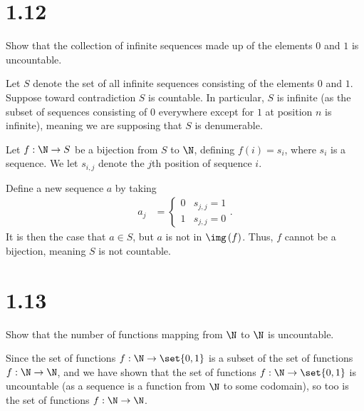 \documentclass[10pt]{mypackage}
\begin{document}
\section{1.12}%
\begin{problem}
  Show that the collection of infinite sequences made up of the elements $0$ and $1$ is uncountable.
\end{problem}
\begin{solution}
  Let $S$ denote the set of all infinite sequences consisting of the elements $0$ and $1$. Suppose toward contradiction $S$ is countable. In particular, $S$ is infinite (as the subset of sequences consisting of $0$ everywhere except for $1$ at position $n$ is infinite), meaning we are supposing that $S$ is denumerable.\newline

  Let $f: \N\rightarrow S$ be a bijection from $S$ to $\N$, defining $f\left(i\right) = s_i$, where $s_i$ is a sequence. We let $s_{i,j}$ denote the $j$th position of sequence $i$.\newline

  Define a new sequence $a$ by taking
  \begin{align*}
    a_{j} &= \begin{cases}
      0 & s_{j,j} = 1\\
      1 & s_{j,j} = 0
    \end{cases}.
  \end{align*}
  It is then the case that $a\in S$, but $a$ is not in $\img\left(f\right)$. Thus, $f$ cannot be a bijection, meaning $S$ is not countable.
\end{solution}
\section{1.13}%
\begin{problem}
  Show that the number of functions mapping from $\N$ to $\N$ is uncountable.
\end{problem}
\begin{solution}
  Since the set of functions $f: \N\rightarrow \set{0,1}$ is a subset of the set of functions $f:\N\rightarrow \N$, and we have shown that the set of functions $f: \N\rightarrow \set{0,1}$ is uncountable (as a sequence is a function from $\N$ to some codomain), so too is the set of functions $f: \N\rightarrow \N$.
\end{solution}
\end{document}
